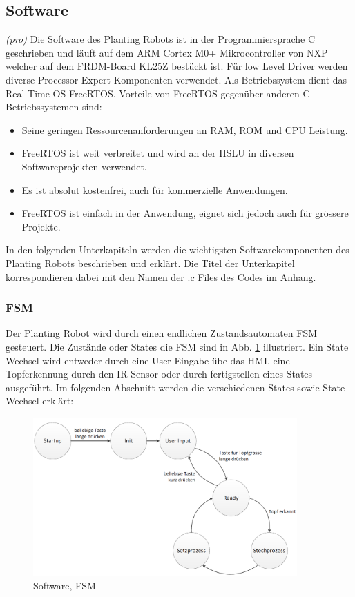 \subsection{Software} \label{sec:Software}
\textit{(pro)} Die Software des Planting Robots ist in der Programmiersprache C geschrieben und läuft auf dem ARM Cortex M0+ Mikrocontroller von NXP welcher auf dem FRDM-Board KL25Z bestückt ist. Für low Level Driver werden diverse Processor Expert Komponenten verwendet. Als Betriebssystem dient das Real Time OS FreeRTOS. Vorteile von FreeRTOS gegenüber anderen C Betriebssystemen sind:

\begin{itemize}
	\item Seine geringen Ressourcenanforderungen an RAM, ROM und CPU Leistung. 
	\item FreeRTOS ist weit verbreitet und wird an der HSLU in diversen Softwareprojekten verwendet.
	\item Es ist absolut kostenfrei, auch für kommerzielle Anwendungen.
	\item FreeRTOS ist einfach in der Anwendung, eignet sich jedoch auch für grössere Projekte.
\end{itemize}

In den folgenden Unterkapiteln werden die wichtigsten Softwarekomponenten des Planting Robots beschrieben und erklärt. Die Titel der Unterkapitel korrespondieren dabei mit den Namen der .c Files des Codes im Anhang.

\subsubsection{FSM} \label{sec:FSM}
Der Planting Robot wird durch einen endlichen Zustandsautomaten FSM gesteuert. Die Zustände oder States die FSM sind in Abb. \ref{fig:FSM} illustriert. Ein State Wechsel wird entweder durch eine User Eingabe übe das HMI, eine Topferkennung durch den IR-Sensor oder durch fertigstellen eines States ausgeführt. Im folgenden Abschnitt werden die verschiedenen States sowie State-Wechsel erklärt:

\begin{figure}[H]
	\includegraphics[width=0.9\textwidth]{Illustrationen/6-Umsetzung/FSM_B&W_breit.png}
	\caption{Software, FSM}
	\label{fig:FSM}
\end{figure}

